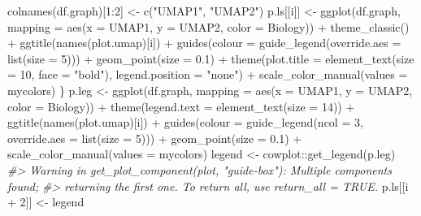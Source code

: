 \documentclass[]{article}
\newcommand{\hlnum}[1]{\textcolor[rgb]{0.816,0.125,0.439}{#1}}%
\newcommand{\hlstr}[1]{\textcolor[rgb]{0.251,0.627,0.251}{#1}}%
\newcommand{\hlcom}[1]{\textcolor[rgb]{0.502,0.502,0.502}{\textit{#1}}}%
\newcommand{\hlstd}[1]{\textcolor[rgb]{0.251,0.251,0.251}{#1}}%
\newenvironment{Shaded}{\begin{myshaded}}{\end{myshaded}}
\newcommand{\DecValTok}[1]{\hlnum{#1}}
\newcommand{\FloatTok}[1]{\hlnum{#1}}
\newcommand{\SpecialCharTok}[1]{\hlstr{#1}}
\newcommand{\StringTok}[1]{\hlstr{#1}}
\newcommand{\CommentTok}[1]{\hlcom{#1}}
\newcommand{\OtherTok}[1]{{#1}}
\newcommand{\FunctionTok}[1]{\hlstd{#1}}
\newcommand{\AttributeTok}[1]{{#1}}
\newcommand{\NormalTok}[1]{\hlstd{#1}}
\begin{document}
\begin{Shaded}
\begin{Highlighting}[]
    \FunctionTok{colnames}\NormalTok{(df.graph)[}\DecValTok{1}\SpecialCharTok{:}\DecValTok{2}\NormalTok{] }\OtherTok{\textless{}{-}} \FunctionTok{c}\NormalTok{(}\StringTok{"UMAP1"}\NormalTok{, }\StringTok{"UMAP2"}\NormalTok{)}
\NormalTok{    p.ls[[i]] }\OtherTok{\textless{}{-}} \FunctionTok{ggplot}\NormalTok{(df.graph, }\AttributeTok{mapping =} \FunctionTok{aes}\NormalTok{(}\AttributeTok{x =}\NormalTok{ UMAP1, }\AttributeTok{y =}\NormalTok{ UMAP2,}
        \AttributeTok{color =}\NormalTok{ Biology)) }\SpecialCharTok{+} \FunctionTok{theme\_classic}\NormalTok{() }\SpecialCharTok{+} \FunctionTok{ggtitle}\NormalTok{(}\FunctionTok{names}\NormalTok{(plot.umap)[i]) }\SpecialCharTok{+}
        \FunctionTok{guides}\NormalTok{(}\AttributeTok{colour =} \FunctionTok{guide\_legend}\NormalTok{(}\AttributeTok{override.aes =} \FunctionTok{list}\NormalTok{(}\AttributeTok{size =} \DecValTok{5}\NormalTok{))) }\SpecialCharTok{+}
        \FunctionTok{geom\_point}\NormalTok{(}\AttributeTok{size =} \FloatTok{0.1}\NormalTok{) }\SpecialCharTok{+} \FunctionTok{theme}\NormalTok{(}\AttributeTok{plot.title =} \FunctionTok{element\_text}\NormalTok{(}\AttributeTok{size =} \DecValTok{10}\NormalTok{,}
        \AttributeTok{face =} \StringTok{"bold"}\NormalTok{), }\AttributeTok{legend.position =} \StringTok{"none"}\NormalTok{) }\SpecialCharTok{+} \FunctionTok{scale\_color\_manual}\NormalTok{(}\AttributeTok{values =}\NormalTok{ mycolors)}
\NormalTok{\}}
\NormalTok{p.leg }\OtherTok{\textless{}{-}} \FunctionTok{ggplot}\NormalTok{(df.graph, }\AttributeTok{mapping =} \FunctionTok{aes}\NormalTok{(}\AttributeTok{x =}\NormalTok{ UMAP1, }\AttributeTok{y =}\NormalTok{ UMAP2,}
    \AttributeTok{color =}\NormalTok{ Biology)) }\SpecialCharTok{+} \FunctionTok{theme}\NormalTok{(}\AttributeTok{legend.text =} \FunctionTok{element\_text}\NormalTok{(}\AttributeTok{size =} \DecValTok{14}\NormalTok{)) }\SpecialCharTok{+}
    \FunctionTok{ggtitle}\NormalTok{(}\FunctionTok{names}\NormalTok{(plot.umap)[i]) }\SpecialCharTok{+} \FunctionTok{guides}\NormalTok{(}\AttributeTok{colour =} \FunctionTok{guide\_legend}\NormalTok{(}\AttributeTok{ncol =} \DecValTok{3}\NormalTok{,}
    \AttributeTok{override.aes =} \FunctionTok{list}\NormalTok{(}\AttributeTok{size =} \DecValTok{5}\NormalTok{))) }\SpecialCharTok{+} \FunctionTok{geom\_point}\NormalTok{(}\AttributeTok{size =} \FloatTok{0.1}\NormalTok{) }\SpecialCharTok{+}
    \FunctionTok{scale\_color\_manual}\NormalTok{(}\AttributeTok{values =}\NormalTok{ mycolors)}
\NormalTok{legend }\OtherTok{\textless{}{-}}\NormalTok{ cowplot}\SpecialCharTok{::}\FunctionTok{get\_legend}\NormalTok{(p.leg)}
\CommentTok{\#\textgreater{} Warning in get\_plot\_component(plot, "guide{-}box"): Multiple components found;}
\CommentTok{\#\textgreater{} returning the first one. To return all, use \textasciigrave{}return\_all = TRUE\textasciigrave{}.}
\NormalTok{p.ls[[i }\SpecialCharTok{+} \DecValTok{2}\NormalTok{]] }\OtherTok{\textless{}{-}}\NormalTok{ legend}


\end{Highlighting}
\end{Shaded}
\end{document}
